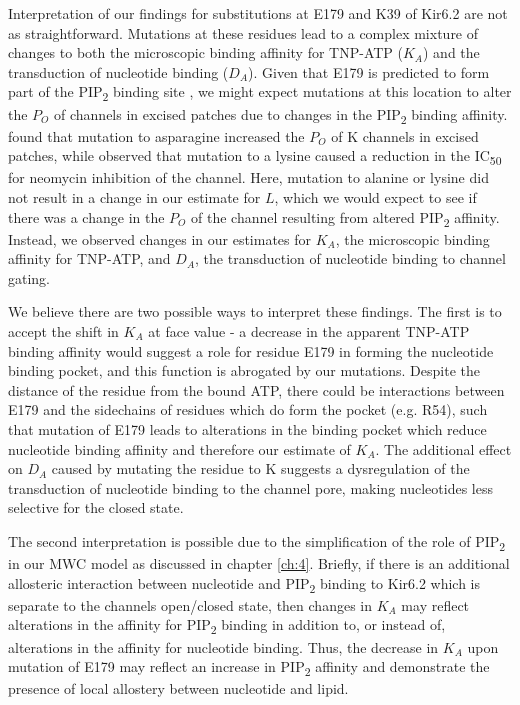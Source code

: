 Interpretation of our findings for substitutions at E179 and K39 of Kir6.2 are not as straightforward.
Mutations at these residues lead to a complex mixture of changes to both the microscopic binding affinity for TNP-ATP ($K_A$) and the transduction of nucleotide binding ($D_A$).
Given that E179 is predicted to form part of the PIP\textsubscript{2} binding site \cite{haider_identification_2007, pipatpolkai_evaluating_2020}, we might expect mutations at this location to alter the $P_O$ of channels in excised patches due to changes in the PIP\textsubscript{2} binding affinity.
\textcite{antcliff_functional_2005} found that mutation to asparagine increased the $P_O$ of K\ATP{} channels in excised patches, while \textcite{pipatpolkai_evaluating_2020} observed that mutation to a lysine caused a reduction in the IC\textsubscript{50} for neomycin inhibition of the channel.
Here, mutation to alanine or lysine did not result in a change in our estimate for $L$, which we would expect to see if there was a change in the $P_O$ of the channel resulting from altered PIP\textsubscript{2} affinity.
Instead, we observed changes in our estimates for $K_A$, the microscopic binding affinity for TNP-ATP, and $D_A$, the transduction of nucleotide binding to channel gating.

We believe there are two possible ways to interpret these findings.
The first is to accept the shift in $K_A$ at face value - a decrease in the apparent TNP-ATP binding affinity would suggest a role for residue E179 in forming the nucleotide binding pocket, and this function is abrogated by our mutations.
Despite the distance of the residue from the bound ATP, there could be interactions between E179 and the sidechains of residues which do form the pocket (e.g. R54), such that mutation of E179 leads to alterations in the binding pocket which reduce nucleotide binding affinity and therefore our estimate of $K_A$.
The additional effect on $D_A$ caused by mutating the residue to K suggests a dysregulation of the transduction of nucleotide binding to the channel pore, making nucleotides less selective for the closed state.

The second interpretation is possible due to the simplification of the role of PIP\textsubscript{2} in our MWC model as discussed in chapter \ref{ch:4}.
Briefly, if there is an additional allosteric interaction between nucleotide and PIP\textsubscript{2} binding to Kir6.2 which is separate to the channels open/closed state, then changes in $K_A$ may reflect alterations in the affinity for PIP\textsubscript{2} binding in addition to, or instead of, alterations in the affinity for nucleotide binding.
Thus, the decrease in $K_A$ upon mutation of E179 may reflect an increase in PIP\textsubscript{2} affinity and demonstrate the presence of local allostery between nucleotide and lipid.

